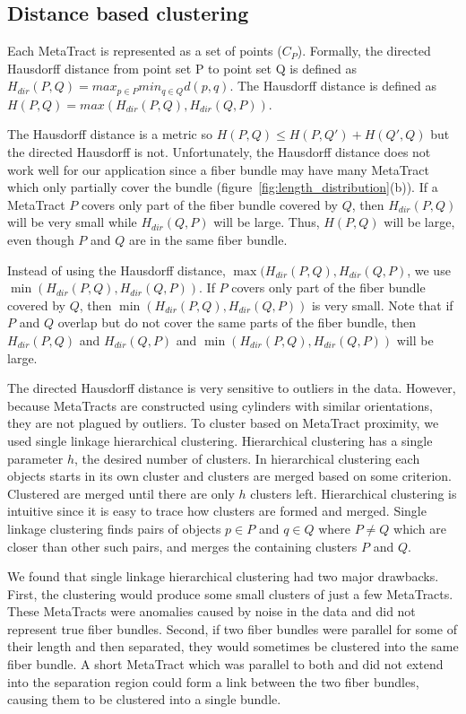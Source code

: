   
\subsection{Distance based clustering}
 \label{subsec:dist_clustering}
 Each MetaTract is represented as a set of points ($C_P$). 
 Formally, the directed Hausdorff distance from point set P to point set Q is defined as 
 $H_{dir}(P,Q) = max_{p \in P} min_{q \in Q} d(p,q).$ The Hausdorff distance is defined as $H(P,Q) = max(H_{dir}(P,Q),H_{dir}(Q,P))$.
 
 The Hausdorff distance is a metric so $H(P,Q) \le H(P,Q') + H(Q',Q)$
 but the directed Hausdorff is not.
 Unfortunately, the Hausdorff distance does not work well for our application since a fiber bundle may have many MetaTract which only partially cover the bundle (figure~\ref{fig:length_distribution}(b)).
 If a MetaTract $P$ covers only part of the fiber bundle covered by $Q$,
 then $H_{dir}(P,Q)$ will be very small while $H_{dir}(Q,P)$ will be large.
 Thus, $H(P,Q)$ will be large, even though $P$ and $Q$ are in the same
 fiber bundle.
 
 Instead of using the Hausdorff distance, $\max(H_{dir}(P,Q),H_{dir}(Q,P)$, we use $\min(H_{dir}(P,Q),H_{dir}(Q,P))$. If $P$ covers only part of the fiber bundle covered by $Q$, then $\min(H_{dir}(P,Q),H_{dir}(Q,P))$ is very small.
 Note that if $P$ and $Q$ overlap but do not cover the same parts of the fiber bundle, then $H_{dir}(P,Q)$ and $H_{dir}(Q,P)$ and $\min(H_{dir}(P,Q),H_{dir}(Q,P))$ will be large.
 
 The directed Hausdorff distance is very sensitive to outliers in the data.
 However, because MetaTracts are constructed using cylinders with similar orientations, they are not plagued by outliers.
 To cluster based on MetaTract proximity, we used single linkage hierarchical clustering.
 Hierarchical clustering has a single parameter $h$, the desired number of clusters.
 In hierarchical clustering each objects starts in its own cluster and clusters are merged based on some criterion.
 Clustered are merged until there are only $h$ clusters left.
 Hierarchical clustering is intuitive since it is easy to trace how clusters are formed and merged.
 Single linkage clustering finds pairs of objects $p \in P$ and $q \in Q$ where $P \neq Q$ which are closer than other such pairs, and merges the containing clusters $P$ and $Q$.
 
 We found that single linkage hierarchical clustering had two major drawbacks.
 First, the clustering would produce some small clusters of just a few MetaTracts.
 These MetaTracts were anomalies caused by noise in the data and did not represent true fiber bundles.
 Second, if two fiber bundles were parallel for some of their length and then separated, they would sometimes be clustered into the same
 fiber bundle.
 A short MetaTract which was parallel to both and did not extend into the separation region could form a link between the two fiber bundles,
 causing them to be clustered into a single bundle.
 
